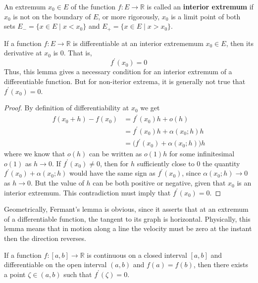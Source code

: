   \begin{definition}
    An extremum $x_0 \in E$ of the function $f: E \longrightarrow \mathbb{R}$ is called an \textbf{interior extremum} if $x_0$ is not on the boundary of $E$, or more rigorously, $x_0$ is a limit point of both sets $E_- = \{x \in E \;|\; x < x_0\}$ and $E_+ = \{ x\in E\;|\; x > x_0\}$. 
  \end{definition}

  \begin{lemma}[Fermant]
    If a function $f: E \longrightarrow \mathbb{R}$ is differentiable at an interior extrememum $x_0 \in E$, then its derivative at $x_0$ is $0$. That is, 
    \[f^\prime (x_0) = 0\]
    Thus, this lemma gives a necessary condition for an interior extremum of a differentiable function. But for non-iterior extrema, it is generally not true that $f^\prime(x_0) = 0$. 
  \end{lemma}
  \begin{proof}
  By definition of differentiability at $x_0$ we get
  \begin{align*}
      f(x_0 + h) - f(x_0) & = f^\prime (x_0) h + o(h) \\
      & = f^\prime(x_0) h + \alpha (x_0; h) h \\
      & = \big(f^\prime (x_0) + \alpha(x_0; h)\big) h
  \end{align*}
  where we know that $o(h)$ can be written as $o(1) h$ for some infinitesimal $o(1)$ as $h \rightarrow 0$. If $f^\prime (x_0) \neq 0$, then for $h$ sufficiently close to $0$ the quantity $f^\prime(x_0) + \alpha(x_0; h)$ would have the same sign as $f^\prime (x_0)$, since $\alpha(x_0; h) \rightarrow 0$ as $h \rightarrow 0$. But the value of $h$ can be both positive or negative, given that $x_0$ is an interior extremum. This contradiction must imply that $f^\prime (x_0) = 0$. 
  \end{proof}

  Geometrically, Fermant's lemma is obvious, since it asserts that at an extremum of a differentiable function, the tangent to its graph is horizontal. Physically, this lemma means that in motion along a line the velocity must be zero at the instant then the direction reverses. 

  \begin{theorem}
  If a function $f: [a, b] \longrightarrow \mathbb{R}$ is continuous on a closed interval $[a,b]$ and differentiable on the open interval $(a, b)$ and $f(a) = f(b)$, then there exists a point $\zeta \in (a, b)$ such that $f^\prime (\zeta) = 0$. 
  \end{theorem}

